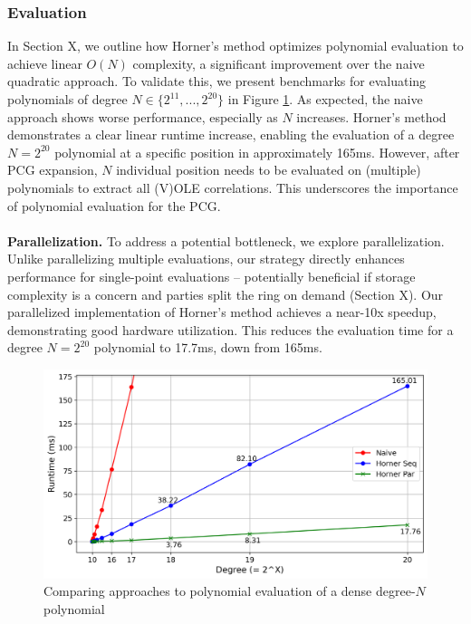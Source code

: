 \subsubsection{Evaluation}
In Section \todo X, we outline how Horner's method optimizes polynomial evaluation to achieve linear $O(N)$ complexity, a significant improvement over the naive quadratic approach. To validate this, we present benchmarks for evaluating polynomials of degree $N \in \{2^{11}, ..., 2^{20}\}$ in Figure \ref{fig:polyEvalBench}. As expected, the naive approach shows worse performance, especially as $N$ increases. Horner's method demonstrates a clear linear runtime increase, enabling the evaluation of a degree $N=2^{20}$ polynomial at a specific position in approximately 165ms. However, after PCG expansion, $N$ individual position needs to be evaluated on (multiple) polynomials to extract all (V)OLE correlations. This underscores the importance of polynomial evaluation for the PCG.
\\\\
\textbf{Parallelization.} To address a potential bottleneck, we explore parallelization. Unlike parallelizing multiple evaluations, our strategy directly enhances performance for single-point evaluations – potentially beneficial if storage complexity is a concern and parties split the ring on demand (Section \todo X). Our parallelized implementation of Horner's method achieves a near-10x speedup, demonstrating good hardware utilization. This reduces the evaluation time for a degree $N=2^{20}$ polynomial to 17.7ms, down from 165ms.

\begin{figure}[t]
    \centering
    \includegraphics[scale=0.49]{images/plots/poly_eval.png}
    \caption{Comparing approaches to polynomial evaluation of a dense degree-$N$ polynomial}
    \label{fig:polyEvalBench}
\end{figure}


